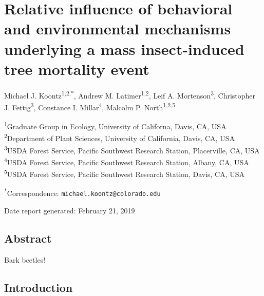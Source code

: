 \documentclass[]{article}
\title{}
\author{}
\date{}
\begin{document}
\section{Relative influence of behavioral and environmental mechanisms
underlying a mass insect-induced tree mortality
event}\label{relative-influence-of-behavioral-and-environmental-mechanisms-underlying-a-mass-insect-induced-tree-mortality-event}

Michael J. Koontz\textsuperscript{1,2,*}, Andrew M.
Latimer\textsuperscript{1,2}, Leif A. Mortenson\textsuperscript{3},
Christopher J. Fettig\textsuperscript{3}, Constance I.
Millar\textsuperscript{4}, Malcolm P. North\textsuperscript{1,2,5}

\textsuperscript{1}Graduate Group in Ecology, University of Californa,
Davis, CA, USA\\
\textsuperscript{2}Department of Plant Sciences, University of
California, Davis, CA, USA\\
\textsuperscript{3}USDA Forest Service, Pacific Southwest Research
Station, Placerville, CA, USA\\
\textsuperscript{4}USDA Forest Service, Pacific Southwest Research
Station, Albany, CA, USA\\
\textsuperscript{5}USDA Forest Service, Pacific Southwest Research
Station, Davis, CA, USA

\textsuperscript{*}Correspondence: \texttt{michael.koontz@colorado.edu}

Date report generated: February 21, 2019

\subsection{Abstract}\label{abstract}

Bark beetles!

\subsection{Introduction}\label{introduction}
\end{document}

